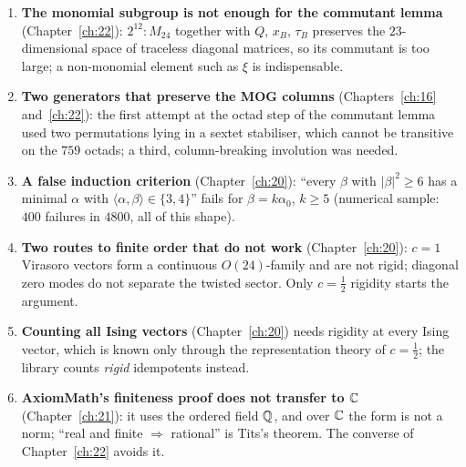 \begin{enumerate}
  self-normalising; it cannot exclude a finite overgroup. Also recorded there: ``real first, then real $\Rightarrow$
  rational'' needs Tits's theorem, and was superseded.
\item \textbf{The monomial subgroup is not enough for the commutant lemma} (Chapter~\ref{ch:22}): $2^{12}{:}M_{24}$
  together with $Q$, $x_B$, $\tau_B$ preserves the $23$-dimensional space of traceless diagonal matrices, so its commutant
  is too large; a non-monomial element such as $\xi$ is indispensable.
\item \textbf{Two generators that preserve the MOG columns} (Chapters~\ref{ch:16} and~\ref{ch:22}): the first attempt at
  the octad step of the commutant lemma used two permutations lying in a sextet stabiliser, which cannot be transitive on
  the $759$ octads; a third, column-breaking involution was needed.
\item \textbf{A false induction criterion} (Chapter~\ref{ch:20}): ``every $\beta$ with $|\beta|^2\ge6$ has a minimal
  $\alpha$ with $\langle\alpha,\beta\rangle\in\{3,4\}$'' fails for $\beta=k\alpha_0$, $k\ge5$ (numerical sample: $400$
  failures in $4800$, all of this shape).
\item \textbf{Two routes to finite order that do not work} (Chapter~\ref{ch:20}): $c=1$ Virasoro vectors form a continuous
  $O(24)$-family and are not rigid; diagonal zero modes do not separate the twisted sector. Only $c=\tfrac12$ rigidity
  starts the argument.
\item \textbf{Counting all Ising vectors} (Chapter~\ref{ch:20}) needs rigidity at every Ising vector, which is known only
  through the representation theory of $c=\tfrac12$; the library counts \emph{rigid} idempotents instead.
\item \textbf{AxiomMath's finiteness proof does not transfer to ${\mathbb{C}}$} (Chapter~\ref{ch:21}): it uses the ordered field
  ${\mathbb{Q}}$, and over ${\mathbb{C}}$ the form is not a norm; ``real and finite $\Rightarrow$ rational'' is Tits's theorem. The converse
  of Chapter~\ref{ch:22} avoids it.
\end{enumerate}

